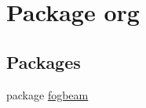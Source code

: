 \hypertarget{namespaceorg}{}\section{Package org}
\label{namespaceorg}
\subsection*{Packages}
\begin{DoxyCompactItemize}
\item 
package \hyperlink{namespaceorg_1_1fogbeam}{fogbeam}
\end{DoxyCompactItemize}
